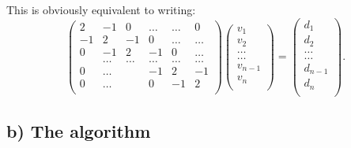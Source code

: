 \documentclass[norsk,a4paper,12pt]{article}
\begin{document}
This is obviously equivalent to writing:
\begin{equation}
    				\left(\begin{array}{cccccc}
                           2& -1& 0 &\dots   & \dots &0 \\
                           -1 & 2 & -1 &0 &\dots &\dots \\
                           0&-1 &2 & -1 & 0 & \dots \\
                           & \dots   & \dots &\dots   &\dots & \dots \\
                           0&\dots   &  &-1 &2& -1 \\
                           0&\dots    &  & 0  &-1 & 2 \\
                      \end{array} \right)\left(\begin{array}{c}
                           v_1\\
                           v_2\\
                           \dots \\
                           \dots \\
                           v_{n-1} \\
                           v_{n}\\
                      \end{array} \right)
  =\left(\begin{array}{c}
                           d_1\\
                           d_2\\
                           \dots \\
                           \dots \\
                           d_{n-1} \\
                           d_n\\
                      \end{array} \right).	
\end{equation}


\subsection*{b) The algorithm}
\end{document}
